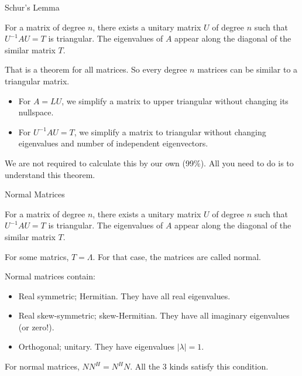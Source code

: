 \documentclass{beamer}
\begin{document}
\begin{frame}{Schur's Lemma}
\begin{theorem}
    For a matrix of degree $n$, there exists a unitary matrix $U$ of degree $n$ such that $U^{-1}AU=T$ is triangular. The eigenvalues of $A$ appear along the diagonal of the similar matrix $T$.
\end{theorem}

That is a theorem for all matrices. So every degree $n$ matrices can be similar to a triangular matrix.

\begin{itemize}
    \item For $A=LU$, we simplify a matrix to upper triangular without changing its nullspace.
    \item For $U^{-1}AU=T$, we simplify a matrix to triangular without changing eigenvalues and number of independent eigenvectors.
\end{itemize}

We are not required to calculate this by our own (99\%). All you need to do is to understand this theorem.
\end{frame}

\begin{frame}{Normal Matrices}
\begin{theorem}
    For a matrix of degree $n$, there exists a unitary matrix $U$ of degree $n$ such that $U^{-1}AU=T$ is triangular. The eigenvalues of $A$ appear along the diagonal of the similar matrix $T$.
\end{theorem}

For some matrics, $T=\varLambda$. For that case, the matrices are called normal.

\vspace{3pt}
Normal matrices contain:
\begin{itemize}
    \item Real symmetric; Hermitian. They have all real eigenvalues.
    \item Real skew-symmetric; skew-Hermitian. They have all imaginary eigenvalues (or zero!).
    \item Orthogonal; unitary. They have eigenvalues $|\lambda|=1$.
\end{itemize}

For normal matrices, $NN^H=N^HN$. All the 3 kinds satisfy this condition.

\end{frame}
\end{document}
